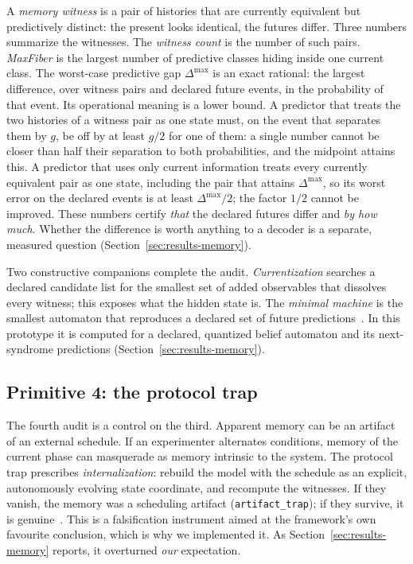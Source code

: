 A \emph{memory witness} is a pair of histories that are currently equivalent but predictively distinct: the present looks identical, the futures differ. Three numbers summarize the witnesses. The \emph{witness count} is the number of such pairs. \emph{MaxFiber} is the largest number of predictive classes hiding inside one current class. The worst-case predictive gap $\Delta^{\max}$ is an exact rational: the largest difference, over witness pairs and declared future events, in the probability of that event. Its operational meaning is a lower bound. A predictor that treats the two histories of a witness pair as one state must, on the event that separates them by $g$, be off by at least $g/2$ for one of them: a single number cannot be closer than half their separation to both probabilities, and the midpoint attains this. A predictor that uses only current information treats every currently equivalent pair as one state, including the pair that attains $\Delta^{\max}$, so its worst error on the declared events is at least $\Delta^{\max}/2$; the factor $1/2$ cannot be improved. These numbers certify \emph{that} the declared futures differ and \emph{by how much}. Whether the difference is worth anything to a decoder is a separate, measured question (Section~\ref{sec:results-memory}).

Two constructive companions complete the audit. \emph{Currentization} searches a declared candidate list for the smallest set of added observables that dissolves every witness; this exposes what the hidden state is. The \emph{minimal machine} is the smallest automaton that reproduces a declared set of future predictions~\cite{sbt-hol,sbt-hid}. In this prototype it is computed for a declared, quantized belief automaton and its next-syndrome predictions (Section~\ref{sec:results-memory}).

\subsection{Primitive 4: the protocol trap}
\label{sec:sbt-trap}

The fourth audit is a control on the third. Apparent memory can be an artifact of an external schedule. If an experimenter alternates conditions, memory of the current phase can masquerade as memory intrinsic to the system. The protocol trap prescribes \emph{internalization}: rebuild the model with the schedule as an explicit, autonomously evolving state coordinate, and recompute the witnesses. If they vanish, the memory was a scheduling artifact (\texttt{artifact\_trap}); if they survive, it is genuine~\cite{sbt-pt,sbt-f1}. This is a falsification instrument aimed at the framework's own favourite conclusion, which is why we implemented it. As Section~\ref{sec:results-memory} reports, it overturned \emph{our} expectation.

